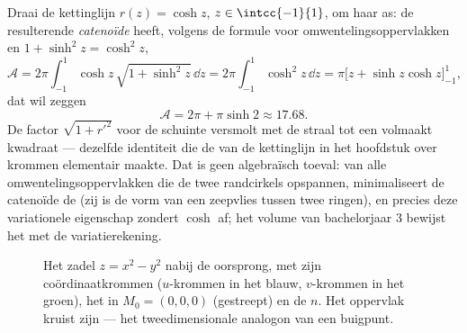 \begin{example}[De catenoïde]\label{ex:b2:surfaces:catenoid}
Draai de kettinglijn $r(z) = \cosh z$, $z \in \intcc{-1}{1}$, om
haar as: de resulterende \emph{catenoïde} heeft, volgens de formule
voor omwentelingsoppervlakken en $1 + \sinh^2 z = \cosh^2 z$,
\[
\mathcal A = 2\pi\int_{-1}^1\cosh z\,\sqrt{1 + \sinh^2z}\,
\dd z = 2\pi\int_{-1}^1\cosh^2z\,\dd z
= \pi\bigl[z + \sinh z\cosh z\bigr]_{-1}^{1},
\]
dat wil zeggen
\[
\mathcal A = 2\pi + \pi\sinh 2 \approx 17.68 .
\]
De factor $\sqrt{1 + r'^2}$ voor de schuinte versmolt met de straal
tot een volmaakt kwadraat --- dezelfde identiteit die de 
van de kettinglijn in het hoofdstuk over krommen elementair maakte.
Dat is geen algebraïsch toeval: van alle omwentelingsoppervlakken
die de twee randcirkels opspannen, minimaliseert de catenoïde de
 (zij is de vorm van een zeepvlies tussen twee ringen),
en precies deze variationele eigenschap zondert $\cosh$ af; het
volume van bachelorjaar 3 bewijst het met de variatierekening.
\end{example}

\begin{figure}[ht]
\centering
{}
\caption{Het zadel $z = x^2 - y^2$ nabij de oorsprong, met zijn
coördinaatkrommen ($u$-krommen in het blauw, $v$-krommen in het
groen), het  in $M_0 = (0,0,0)$ (gestreept) en de
 $n$. Het oppervlak kruist zijn  --- het
tweedimensionale analogon van een buigpunt.}
\label{fig:b2:surfaces:saddle}
\end{figure}

